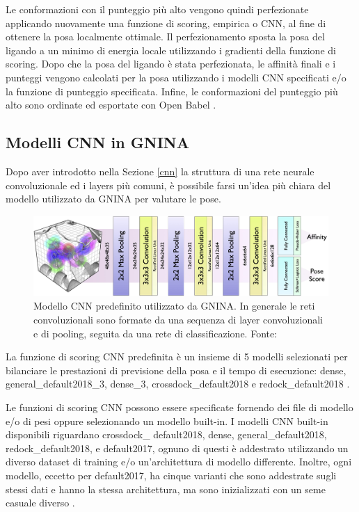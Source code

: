 Le conformazioni con il punteggio più alto vengono quindi perfezionate applicando nuovamente una funzione di scoring, empirica o CNN, al fine di ottenere la posa localmente ottimale.
Il perfezionamento sposta la posa del ligando a un minimo di energia locale utilizzando i gradienti della funzione di scoring. Dopo che la posa del ligando è stata perfezionata, le affinità finali e i punteggi vengono calcolati per la posa utilizzando i modelli CNN specificati e/o la funzione di punteggio specificata. Infine, le conformazioni del punteggio più alto sono ordinate ed esportate con Open Babel \cite{mcnutt_gnina_2021}. 

\subsection{Modelli CNN in GNINA}
Dopo aver introdotto nella Sezione \ref{cnn} la struttura di una rete neurale convoluzionale ed i layers più comuni, è possibile farsi un'idea più chiara del modello utilizzato da GNINA per valutare le pose. 

\begin{figure}[H]
    \centering
    \includegraphics[scale=0.09]{images/cnn_model.jpg}
    \caption[Modello CNN predefinito utilizzato da GNINA.]{Modello CNN predefinito utilizzato da GNINA. In generale le reti convoluzionali sono formate da una sequenza di layer convoluzionali e di pooling, seguita da una rete di classificazione. Fonte: \cite{mcnutt_gnina_2021}}
    \label{fig:cnn_model}
\end{figure}

La funzione di scoring CNN predefinita è un insieme di 5 modelli selezionati per bilanciare le prestazioni di previsione della posa e il tempo di esecuzione: dense, general\_default2018\_3, dense\_3, crossdock\_default2018 e redock\_default2018 \cite{mcnutt_gnina_2021}.


Le funzioni di scoring CNN possono essere specificate fornendo dei file di modello e/o di pesi oppure selezionando un modello built-in. 
I modelli CNN built-in disponibili riguardano crossdock\_ default2018, dense, general\_default2018, redock\_default2018, e default2017, ognuno di questi è addestrato utilizzando un diverso dataset di training e/o un'architettura di modello differente. Inoltre, ogni modello, eccetto per default2017, ha cinque varianti che sono addestrate sugli stessi dati e hanno la stessa architettura, ma sono inizializzati con un seme casuale diverso \cite{mcnutt_gnina_2021}. 


